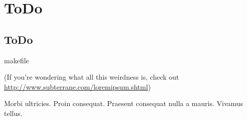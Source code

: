 \chapter{ToDo}

\section{ToDo}
makefile

(If you're wondering what all this weirdness is, check out\\
\url{http://www.subterrane.com/loremipsum.shtml})

Morbi ultricies. Proin consequat. Praesent consequat nulla a mauris.
Vivamus tellus. 


